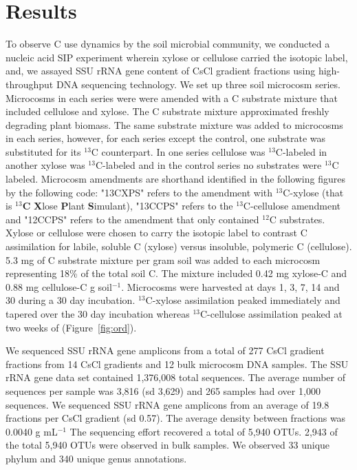 \section{Results}
To observe C use dynamics by the soil microbial community, we conducted a
nucleic acid SIP experiment wherein xylose or cellulose carried the isotopic
label, and, we assayed SSU rRNA gene content of CsCl gradient fractions using
high-throughput DNA sequencing technology. We set up three soil microcosm
series.  Microcosms in each series were were amended with a C substrate mixture
that included cellulose and xylose. The C substrate mixture approximated
freshly degrading plant biomass. The same substrate mixture was added to
microcosms in each series, however, for each series except the control, one
substrate was substituted for its $^{13}$C counterpart. In one series cellulose
was $^{13}$C-labeled in another xylose was $^{13}$C-labeled and in the control
series no substrates were $^{13}$C labeled. Microcosm amendments are shorthand
identified in the following figures by the following code: "13CXPS" refers to
the amendment with $^{13}$C-xylose (that is $^{13}$\textbf{C} \textbf{X}lose
\textbf{P}lant \textbf{S}imulant), "13CCPS" refers to the $^{13}$C-cellulose
amendment and "12CCPS" refers to the amendment that only contained $^{12}$C
substrates. Xylose or cellulose were chosen to carry the isotopic label to
contrast C assimilation for labile, soluble C (xylose) versus insoluble,
polymeric C (cellulose).  5.3 mg of C substrate mixture per gram soil was added
to each microcosm representing 18\% of the total soil C. The mixture included
0.42 mg xylose-C and 0.88 mg cellulose-C g soil$^{-1}$.  Microcosms were
harvested at days 1, 3, 7, 14 and 30  during a 30 day incubation.
$^{13}$C-xylose assimilation peaked immediately and tapered over the 30 day
incubation whereas $^{13}$C-cellulose assimilation peaked at two weeks of
(Figure~\ref{fig:ord}).

We sequenced SSU rRNA gene amplicons from a total of 277 CsCl gradient
fractions from 14 CsCl gradients and 12 bulk microcosm DNA samples. The SSU
rRNA gene data set contained 1,376,008 total sequences. The average number of
sequences per sample was 3,816 (sd 3,629) and 265 samples had over 1,000
sequences. We sequenced SSU rRNA gene amplicons from an average of 19.8
fractions per CsCl gradient (sd 0.57). The average density between fractions
was  0.0040 g mL$^{-1}$ The sequencing effort recovered a total of 5,940 OTUs.
2,943 of the total 5,940 OTUs were observed in bulk samples. We observed 33
unique phylum and 340 unique genus annotations.

